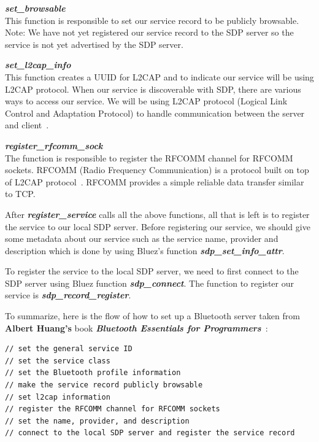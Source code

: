 \documentclass[letterpaper,twocolumn,10pt]{article}
\begin{document}
{\hrulefill

\textbf{\emph{set\_browsable}}\\
This function is responsible to set our service record to be publicly browsable. Note: We have not yet registered our service record to the SDP server so the service is not yet advertised by the SDP server.

\hrulefill

\textbf{\emph{set\_l2cap\_info}}\\
This function creates a UUID for L2CAP and to indicate our service will be using L2CAP protocol. When our service is discoverable with SDP, there are various ways to access our service. We will be using L2CAP protocol (Logical Link Control and Adaptation Protocol) to handle communication between the server and client~\cite{bluetooth_sdp_development}.

\hrulefill

\textbf{\emph{register\_rfcomm\_sock}}\\
The function is responsible to register the RFCOMM channel for RFCOMM sockets. RFCOMM (Radio Frequency Communication) is a protocol built on top of L2CAP protocol~\cite{bluetooth_wiki}. RFCOMM provides a simple reliable data transfer similar to TCP.

\hrulefill

After \textbf{\emph{register\_service}} calls all the above functions, all that is left is to register the service to our local SDP server. Before registering our service, we should give some metadata about our service such as the service name, provider and description which is done by using Bluez's function \textbf{\emph{sdp\_set\_info\_attr}}.

To register the service to the local SDP server, we need to first connect to the SDP server using Bluez function \textbf{\emph{sdp\_connect}}. The function to register our service is \textbf{\emph{sdp\_record\_register}}.

To summarize, here is the flow of how to set up a Bluetooth server taken from \textbf{Albert Huang's} book \textbf{\emph{Bluetooth Essentials for Programmers}}~\cite{bluetooth_essentials_book}:
{\small
\begin{lstlisting}// set the general service ID
// set the service class
// set the Bluetooth profile information
// make the service record publicly browsable
// set l2cap information
// register the RFCOMM channel for RFCOMM sockets
// set the name, provider, and description
// connect to the local SDP server and register the service record
\end{lstlisting}

}}
\end{document}

